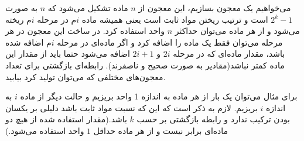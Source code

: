 \p 
    می‌خواهیم یک معجون بسازیم،
    این معجون از 
    $n$
    ماده تشکیل می‌شود که
    $n$
    به صورت
    $2^{k}-1$
    است و ترتیب ریختن مواد ثابت است یعنی همیشه ماده 
    $i$م
    در مرحله 
    $i$م
    ریخته می‌شود
    و از هر ماده می‌توان حداکثر 
    $n$
    واحد استفاده کرد.
    در ساخت این معجون در هر مرحله می‌توان فقط یک ماده را اضافه کرد و اگر ماده‌ای در مرحله
    $i‌$م
    اضافه شده باشد، مقدار ماده‌ای که در مرحله 
    $2i$
    و
    $2i+1$
    اضافه می‌شود حتما باید از مقدار این ماده کمتر نباشد(مقادیر به صورت صحیح و ناصفرند).
    رابطه‌ای بازگشتی برای تعداد معجون‌های مختلفی که می‌توان تولید کرد بیابید.


    برای مثال می‌توان یک بار از هر ماده به اندازه 1 واحد بریزیم و حالت دیگر از ماده
    $i$ به اندازه $i$ بریزیم. لازم به ذکر است که این که نسبت مواد ثابت باشد دلیلی بر یکسان بودن ترکیب ندارد و رابطه بازگشتی بر حسب $k$ باشد.(مقدار استفاده شده از هیچ دو ماده‌ای برابر نیست و از هر ماده حداقل $1$ واحد استفاده می‌شود.)
